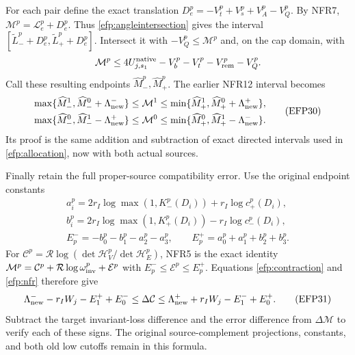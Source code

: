 \documentclass[11pt,a4paper]{article}
\begin{document}
For each pair define the exact translation
$D_e^p=-V_t^p+V_s^p+V_A^p-V_Q^p$.
By NFR7, $\mathcal M^p=\mathcal L_e^p+D_e^p$.
Thus \eqref{efp:angleintersection} gives the interval
$[\widetilde L_-^p+D_e^p,\widetilde L_+^p+D_e^p]$.
Intersect it with $-V_Q^p\le\mathcal M^p$ and, on the cap domain, with
\[
\mathcal M^p\le
 4U_{j,s_1}^{\rm native}-V_b^p-V_t^p-V_{\rm rem}^p-V_Q^p .
\]
Call these resulting endpoints $\widehat M_-^p,\widehat M_+^p$.
The earlier NFR12 interval becomes
\[
\begin{aligned}
\max\{\widehat M_-^1,\widehat M_-^0+\Lambda_{\rm new}^-\}
 &\le\mathcal M^1
 \le\min\{\widehat M_+^1,\widehat M_+^0+\Lambda_{\rm new}^+\},\\
\max\{\widehat M_-^0,\widehat M_-^1-\Lambda_{\rm new}^+\}
 &\le\mathcal M^0
 \le\min\{\widehat M_+^0,\widehat M_+^1-\Lambda_{\rm new}^-\}.
\end{aligned}\tag{EFP30}\label{efp:nfrinterval}
\]
Its proof is the same addition and subtraction of exact directed
intervals used in \eqref{efp:allocation}, now with both actual sources.

Finally retain the full proper-source compatibility error.
Use the original endpoint constants
\[
\begin{gathered}
a_i^p=2r_I\log\max(1,K_-^p(D_i))+r_I\log c_+^p(D_i),\\
b_i^p=2r_I\log\max(1,K_+^p(D_i))-r_I\log c_-^p(D_i),\\
E_p^-=-b_0^p-b_1^p-a_2^p-a_3^p,\qquad
E_p^+=a_0^p+a_1^p+b_2^p+b_3^p.
\end{gathered}
\]
For $\mathcal C^p=\mathcal R\log(\det\mathcal H_V^p/
\det\mathcal H_E^p)$, NFR5 is the exact identity
$\mathcal M^p=\mathcal C^p+
\mathcal R\log\omega_{\rm inv}^p+\mathcal E^p$ with
$E_p^-\le\mathcal E^p\le E_p^+$.
Equations \eqref{efp:contraction} and \eqref{efp:nfr} therefore give
\[
\begin{aligned}
\Lambda_{\rm new}^- -r_IW_j-E_1^++E_0^-
 \le\Delta\mathcal C
 \le\Lambda_{\rm new}^+ +r_IW_j-E_1^-+E_0^+ .
\end{aligned}\tag{EFP31}\label{efp:nfrerror}
\]
Subtract the target invariant-loss difference and the error
difference from $\Delta\mathcal M$ to verify each of these signs.
The original source-complement projections, constants, and both
old low cutoffs remain in this formula.
\end{document}
